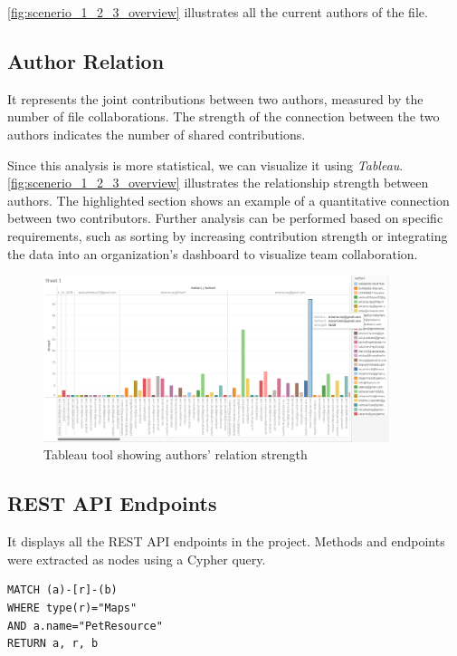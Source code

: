 \autoref{fig:scenerio_1_2_3_overview} illustrates all the current authors of the file.

\subsection{Author Relation}
It represents the joint contributions between two authors, measured by the number of file collaborations. The strength of the connection between the two authors indicates the number of shared contributions.

Since this analysis is more statistical, we can visualize it using \textit{Tableau}. \autoref{fig:scenerio_1_2_3_overview} illustrates the relationship strength between authors. The highlighted section shows an example of a quantitative connection between two contributors. Further analysis can be performed based on specific requirements, such as sorting by increasing contribution strength or integrating the data into an organization's dashboard to visualize team collaboration.

\begin{figure}[H]
    \centering
    \includegraphics[width=0.9\textwidth]{figures/author_relation_strength.png}
    \caption{Tableau tool showing authors' relation strength}
    \label{fig:auth_relation_strength}
\end{figure}

\subsection{REST API Endpoints}
It displays all the REST API endpoints in the project. Methods and endpoints were extracted as nodes using a Cypher query.

\begin{lstlisting}
MATCH (a)-[r]-(b)
WHERE type(r)="Maps"
AND a.name="PetResource"
RETURN a, r, b
\end{lstlisting}

